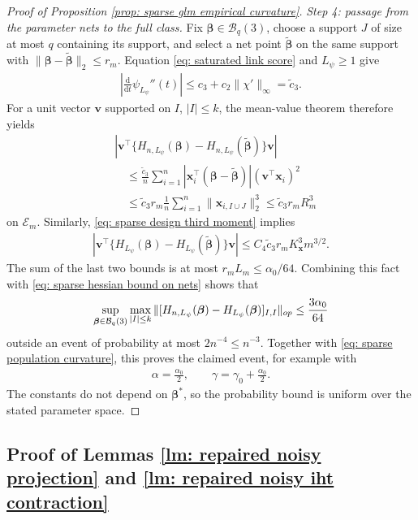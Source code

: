 \documentclass[letterpaper,12pt]{article}
\renewcommand{\d}{\mathrm{d}}
\numberwithin{equation}{section}
\theoremstyle{plain}
\numberwithin{Theorem}{section}
\numberwithin{proposition}{section}
\numberwithin{Lemma}{section}
{
	\theoremstyle{definition}
	\newtheorem{Definition}{Definition}
	\newtheorem{example}{Example}
	\numberwithin{example}{section}
	\newtheorem{fact}{Fact}
	\numberwithin{fact}{section}
	\newtheorem{remark}{Remark}
}
\newcommand{\1}{\mathbbm{1}}
\def\bbeta{{\boldsymbol{\beta}}}
\begin{document}
\begin{proof}[Proof of Proposition \ref{prop: sparse glm empirical curvature}]
\textit{Step 4: passage from the parameter nets to the full class.}
Fix $\bbeta\in\mathcal B_q(3)$, choose a support $J$ of size at most
$q$ containing its support, and select a net point
$\widetilde\bbeta$ on the same support with
$\|\bbeta-\widetilde\bbeta\|_2\leq r_m$. Equation
\eqref{eq: saturated link score} and $L_\psi\geq1$ give
\begin{align*}
\left|\frac{\d}{\d t}\psi_{L_\psi}''(t)\right|
\leq c_3+c_2\|\chi'\|_\infty=\widetilde c_3.
\end{align*}
For a unit vector $\bm v$ supported on $I$, $|I|\leq k$, the
mean-value theorem therefore yields
\begin{align*}
&\left|\bm v^\top\{H_{n,L_\psi}(\bbeta)
-H_{n,L_\psi}(\widetilde\bbeta)\}\bm v\right|\\
&\quad\leq
\frac{\widetilde c_3}{n}\sum_{i=1}^n
|\bm x_i^\top(\bbeta-\widetilde\bbeta)|
(\bm v^\top\bm x_i)^2\\
&\quad\leq \widetilde c_3r_m\frac1n\sum_{i=1}^n
\|\bm x_{i,I\cup J}\|_2^3
\leq \widetilde c_3r_mR_m^3
\end{align*}
on $\mathcal E_m$.  Similarly, \eqref{eq: sparse design third moment}
implies
\begin{align*}
\left|\bm v^\top\{H_{L_\psi}(\bbeta)
-H_{L_\psi}(\widetilde\bbeta)\}\bm v\right|
\leq C_4\widetilde c_3r_mK_{\bm x}^3m^{3/2}.
\end{align*}
The sum of the last two bounds is at most
$r_mL_m\leq\alpha_0/64$.  Combining this fact with
\eqref{eq: sparse hessian bound on nets} shows that
\begin{align}
\sup_{\bbeta\in\mathcal B_q(3)}\max_{|I|\leq k}
\|[H_{n,L_\psi}(\bbeta)-H_{L_\psi}(\bbeta)]_{I,I}\|_{\rm op}
\leq\frac{3\alpha_0}{64}                                    \label{eq: sparse uniform empirical hessian}
\end{align}
outside an event of probability at most $2n^{-4}\leq n^{-3}$.
Together with \eqref{eq: sparse population curvature}, this proves the
claimed event, for example with
\begin{align*}
\alpha=\frac{\alpha_0}{2},\qquad
\gamma=\gamma_0+\frac{\alpha_0}{2}.
\end{align*}
The constants do not depend on $\bbeta^*$, so the probability bound is
uniform over the stated parameter space.
\end{proof}

\subsection{Proof of Lemmas \ref{lm: repaired noisy projection} and \ref{lm: repaired noisy iht contraction}}\label{sec: proofs of sparse glm auxiliary lemmas}
\end{document}
